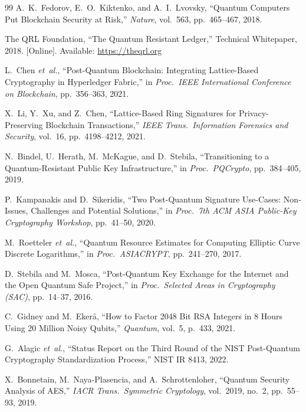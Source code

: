 \documentclass[12pt, a4paper, twocolumn]{article}
\begin{document}
\begin{thebibliography}{99}
A.~K.~Fedorov, E.~O.~Kiktenko, and A.~I.~Lvovsky, ``Quantum Computers Put Blockchain Security at Risk,'' \textit{Nature}, vol.~563, pp.~465--467, 2018.

The QRL Foundation, ``The Quantum Resistant Ledger,'' Technical Whitepaper, 2018. [Online]. Available: \url{https://theqrl.org}

L.~Chen \textit{et~al.}, ``Post-Quantum Blockchain: Integrating Lattice-Based Cryptography in Hyperledger Fabric,'' in \textit{Proc.\ IEEE International Conference on Blockchain}, pp.~356--363, 2021.

X.~Li, Y.~Xu, and Z.~Chen, ``Lattice-Based Ring Signatures for Privacy-Preserving Blockchain Transactions,'' \textit{IEEE Trans.\ Information Forensics and Security}, vol.~16, pp.~4198--4212, 2021.

N.~Bindel, U.~Herath, M.~McKague, and D.~Stebila, ``Transitioning to a Quantum-Resistant Public Key Infrastructure,'' in \textit{Proc.\ PQCrypto}, pp.~384--405, 2019.

P.~Kampanakis and D.~Sikeridis, ``Two Post-Quantum Signature Use-Cases: Non-Issues, Challenges and Potential Solutions,'' in \textit{Proc.\ 7th ACM ASIA Public-Key Cryptography Workshop}, pp.~41--50, 2020.

M.~Roetteler \textit{et~al.}, ``Quantum Resource Estimates for Computing Elliptic Curve Discrete Logarithms,'' in \textit{Proc.\ ASIACRYPT}, pp.~241--270, 2017.

D.~Stebila and M.~Mosca, ``Post-Quantum Key Exchange for the Internet and the Open Quantum Safe Project,'' in \textit{Proc.\ Selected Areas in Cryptography (SAC)}, pp.~14--37, 2016.

C.~Gidney and M.~Eker\aa, ``How to Factor 2048 Bit RSA Integers in 8 Hours Using 20 Million Noisy Qubits,'' \textit{Quantum}, vol.~5, p.~433, 2021.

G.~Alagic \textit{et~al.}, ``Status Report on the Third Round of the NIST Post-Quantum Cryptography Standardization Process,'' NIST IR 8413, 2022.

X.~Bonnetain, M.~Naya-Plasencia, and A.~Schrottenloher, ``Quantum Security Analysis of AES,'' \textit{IACR Trans.\ Symmetric Cryptology}, vol.~2019, no.~2, pp.~55--93, 2019.


\end{thebibliography}
\end{document}

